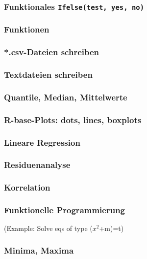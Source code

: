 \documentclass[paper=A4, pagesize, DIV=calc, smallheadings,
fontsize=12pt, expansion=false]{scrreprt}
\begin{document}
\subsubsection*{Funktionales \texttt{Ifelse(test, yes, no)}}

\subsubsection*{Funktionen}

\subsubsection*{*.csv-Dateien schreiben}

\subsubsection*{Textdateien schreiben}

\subsubsection*{Quantile, Median, Mittelwerte}


\subsubsection{R-base-Plots: dots, lines, boxplots}

\subsubsection{Lineare Regression}

\subsubsection{Residuenanalyse}

\subsubsection{Korrelation}

\subsubsection*{Funktionelle Programmierung}
(Example: Solve eqs of type ($x^2$+m)=t)

\subsubsection*{Minima, Maxima}
\end{document}

